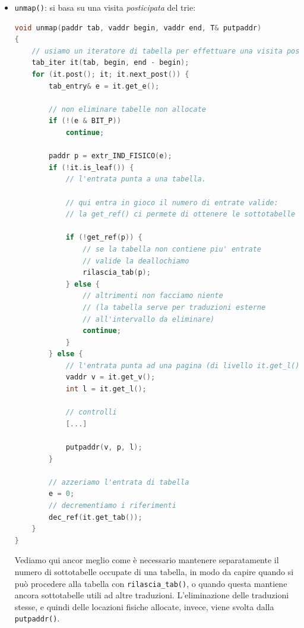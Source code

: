 \documentclass[a4paper,11pt]{article}
\begin{document}
\begin{itemize}
\begin{lstlisting}[language=C++, style=codestyle]
			// 'e' non puntava a niente e ora deve puntare a new_f
			set_IND_FISICO(e, new_f);
			e |= BIT_P;

			// dobbiamo incrementare il contatore delle entrate
			// valide della tabella a cui 'e' appartiene
			inc_ref(it.get_tab());
		}
		
		// configura altri flag
		e |= (flags & (BIT_RW|BIT_US));
	}
	return end;
\end{lstlisting}
Vediamo quindi che la situazione rispetto all'ultima volta si complica: non abbiamo bisogno soltanto della \lstinline|getpaddr()|, per l'ottenimento degli indirizzi fisici, ma anche della \lstinline|alloca_tab()| per l'allocazione di tabelle del trie.
	Questo ha senso, in quanto la tabella si distingue dal semplice frame di collegato a una pagina, per il fatto che necessita di un contatore di entrate valide che ne facilità la pulizia in caso di inutilizzo.
	Come vedremo, in ogni caso, sia la \lstinline|getpaddr()| che la \lstinline|alloca_tab()| vengono spesso definite, ad esempio nel nucleo, sulla base della stessa funzione helper per l'ottenimento di memoria libera (\lstinline|allocaframe()|); 
\item \lstinline|unmap()|: si basa su una visita \textit{posticipata} del trie:
\begin{lstlisting}[language=C++, style=codestyle]	
void unmap(paddr tab, vaddr begin, vaddr end, T& putpaddr)
{
	// usiamo un iteratore di tabella per effettuare una visita posticipata
	tab_iter it(tab, begin, end - begin);
	for (it.post(); it; it.next_post()) {
		tab_entry& e = it.get_e();
		
		// non eliminare tabelle non allocate
		if (!(e & BIT_P))
			continue;

		paddr p = extr_IND_FISICO(e);
		if (!it.is_leaf()) {
			// l'entrata punta a una tabella.
			
			// qui entra in gioco il numero di entrate valide:
			// la get_ref() ci permete di ottenere le sottotabelle con P alto

			if (!get_ref(p)) {
				// se la tabella non contiene piu' entrate
				// valide la deallochiamo
				rilascia_tab(p);
			} else {
				// altrimenti non facciamo niente
				// (la tabella serve per traduzioni esterne
				// all'intervallo da eliminare)
				continue;
			}
		} else {
			// l'entrata punta ad una pagina (di livello it.get_l())
			vaddr v = it.get_v();
			int l = it.get_l();
			
			// controlli
			[...]

			putpaddr(v, p, l);
		}

		// azzeriamo l'entrata di tabella
		e = 0;
		// decrementiamo i riferimenti
		dec_ref(it.get_tab());
	}
}
\end{lstlisting}
Vediamo qui ancor meglio come è necessario mantenere separatamente il numero di sottotabelle occupate di una tabella, in modo da capire quando si può procedere alla tabella con \lstinline|rilascia_tab()|, o quando questa mantiene ancora sottotabelle utili ad altre traduzioni.
L'eliminazione delle traduzioni stesse, e quindi delle locazioni fisiche allocate, invece, viene svolta dalla \lstinline|putpaddr()|.
\end{itemize}
\end{document}
